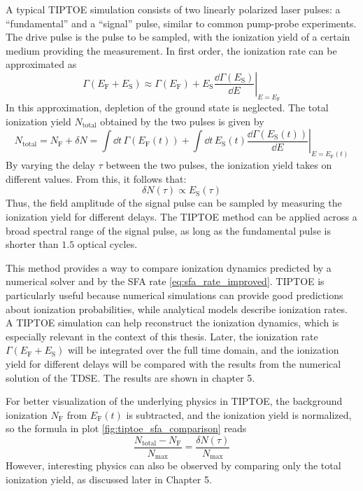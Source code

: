 A typical TIPTOE simulation consists of two linearly polarized laser pulses: a ``fundamental'' and a ``signal'' pulse, similar to common pump-probe experiments.
The drive pulse is the pulse to be sampled, with the ionization yield of a certain medium providing the measurement.
In first order, the ionization rate can be approximated as
\begin{equation}
    \Gamma(E_{\mathrm{F}}+E_{\mathrm{S}})\approx\Gamma(E_{\mathrm{F}})+\left.E_{\mathrm{S}}\frac{\dd \Gamma(E_{\mathrm{S}})}{\dd E}\right|_{E=E_{\mathrm{F}}}
\end{equation}
In this approximation, depletion of the ground state is neglected.
The total ionization yield $N_{\mathrm{total}}$ obtained by the two pulses is given by
\begin{equation*}
    N_{\mathrm{total}}=N_{\mathrm{F}}+\delta N = \int \dd t\,\Gamma(E_{\mathrm{F}}(t))+\int \dd t\,E_{\mathrm{S}}(t)\left.\frac{\dd \Gamma(E_{\mathrm{S}}(t))}{\dd E}\right|_{E=E_{\mathrm{F}}(t)}
\end{equation*}
By varying the delay $\tau$ between the two pulses, the ionization yield takes on different values.
From this, it follows that:
\begin{equation}
    \delta N(\tau)\propto E_{\mathrm{S}}(\tau) \label{eq:tiptoeprop}
\end{equation}
Thus, the field amplitude of the signal pulse can be sampled by measuring the ionization yield for different delays.
The TIPTOE method can be applied across a broad spectral range of the signal pulse, as long as the fundamental pulse is shorter than $1.5$ optical cycles.

\bigskip
This method provides a way to compare ionization dynamics predicted by a numerical solver and by the SFA rate \eqref{eq:sfa_rate_improved}.
TIPTOE is particularly useful because numerical simulations can provide good predictions about ionization probabilities, while analytical models describe ionization rates.
A TIPTOE simulation can help reconstruct the ionization dynamics, which is especially relevant in the context of this thesis.
Later, the ionization rate $\Gamma(E_{\mathrm{F}}+E_{\mathrm{S}})$ will be integrated over the full time domain, and the ionization yield for different delays will be compared with the results from the numerical solution of the TDSE.
The results are shown in chapter 5.

For better visualization of the underlying physics in TIPTOE, the background ionization $N_{\mathrm{F}}$ from $E_\mathrm{F}(t)$ is subtracted, and the ionization yield is normalized, so the formula in plot \ref{fig:tiptoe_sfa_comparison} reads
\begin{equation*}
    \frac{N_{\mathrm{total}}-N_{\mathrm{F}}}{N_{\mathrm{max}}}=\frac{\delta N(\tau)}{N_{\mathrm{max}}}
\end{equation*}
However, interesting physics can also be observed by comparing only the total ionization yield, as discussed later in Chapter 5.


